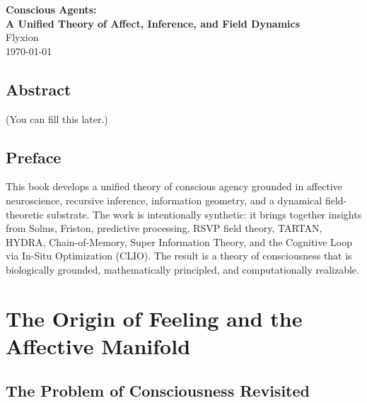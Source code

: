 \documentclass[12pt,oneside]{book}
\theoremstyle{plain}
\theoremstyle{definition}
\begin{document}
\begin{titlepage}
\centering
{\Huge\bfseries
Conscious Agents:\\
A Unified Theory of Affect, Inference, and Field Dynamics\\[1em]
}
{\large Flyxion}\\[2em]
\vfill
{\large \today}
\end{titlepage}

\frontmatter

\chapter*{Abstract}


(You can fill this later.)

\tableofcontents

\mainmatter

\chapter*{Preface}
This book develops a unified theory of conscious agency grounded in
affective neuroscience, recursive inference, information geometry, and
a dynamical field-theoretic substrate. The work is intentionally synthetic:
it brings together insights from Solms, Friston, predictive processing,
RSVP field theory, TARTAN, HYDRA, Chain-of-Memory, Super Information
Theory, and the Cognitive Loop via In-Situ Optimization (CLIO).
The result is a theory of consciousness that is biologically grounded,
mathematically principled, and computationally realizable.

\vspace{1em}

\part{The Origin of Feeling and the Affective Manifold}

\chapter{The Problem of Consciousness Revisited}
\end{document}
